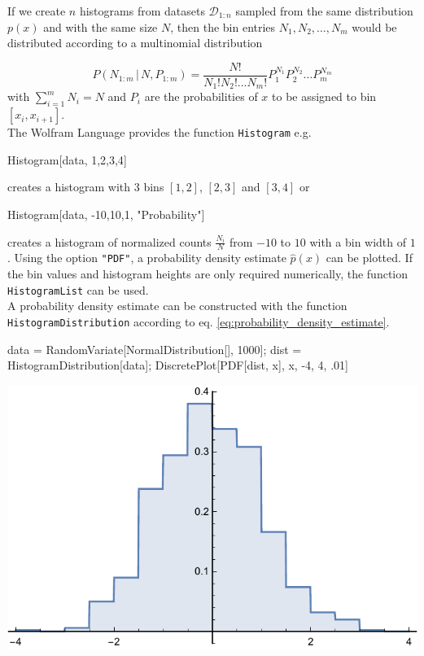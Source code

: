 \documentclass{tstextbook}
\begin{document}
If we create $n$ histograms from datasets $\mathcal{D}_{1:n}$ sampled from the same distribution $p(x)$ and with the same size $N$, then the bin entries $N_1,N_2,\ldots,N_m$ would be distributed according to a multinomial distribution

  \begin{equation}
    P(N_{1:m}\,\vert\, N,P_{1:m})=\frac{N!}{N_1!N_2!\ldots N_m!}P_1^{N_1}P_2^{N_2}\ldots P_m^{N_m}
  \end{equation}
with $\sum_{i=1}^m N_i=N$ and $P_i$ are the probabilities of $x$ to be assigned to bin $[x_i,x_{i+1}]$.\\

The Wolfram Language provides the function \texttt{Histogram} e.g. 
\begin{mathematica}
Histogram[data, {{1,2,3,4}}]
\end{mathematica}
creates a histogram with 3 bins $[1,2]$, $[2,3]$ and $[3,4]$ or 
\begin{mathematica}
Histogram[data, {-10,10,1}, "Probability"]
\end{mathematica}
creates a histogram of normalized counts $\frac{N_i}{N}$ from $-10$ to $10$ with a bin width of $1$. Using the option \texttt{"PDF"}, a probability density estimate $\hat{p}(x)$ can be plotted. If the bin values and histogram heights are only required numerically, the function \texttt{HistogramList} can be used.\\

A probability density estimate can be constructed with the function \texttt{HistogramDistribution}  according to eq. \ref{eq:probability_density_estimate}.
\begin{mathematica}
data = RandomVariate[NormalDistribution[], 1000];
dist = HistogramDistribution[data];
DiscretePlot[PDF[dist, x], {x, -4, 4, .01}]
\end{mathematica}

 \includegraphics[scale=0.9]{images/histogram_distribution.pdf}
\end{document}
